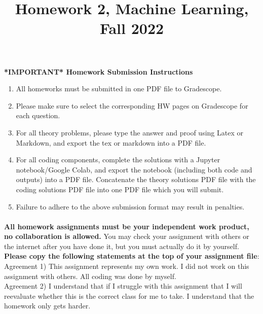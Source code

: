 \documentclass{exam}
\title{Homework 2, Machine Learning, Fall 2022}
\author{ }
\date{}
\begin{document}
\maketitle
\textbf{*IMPORTANT* Homework Submission Instructions}
\begin{enumerate}
    \item All homeworks must be submitted in one PDF file to Gradescope. 
    \item Please make sure to select the corresponding HW pages on Gradescope for each question.
    \item For all theory problems, please type the answer and proof using Latex or Markdown, and export the tex or markdown into a PDF file. 
    \item For all coding components, complete the solutions with a Jupyter notebook/Google Colab, and export the notebook (including both code and outputs) into a PDF file. Concatenate the theory solutions PDF file with the coding solutions PDF file into one PDF file which you will submit. 
    \item Failure to adhere to the above submission format may result in penalties.  
\end{enumerate}


\paragraph{} \textbf{All homework assignments must be your independent work product, no collaboration is allowed.} You may check your assignment with others or the internet after you have done it, but you must actually do it by yourself. \textbf{Please copy the following statements at the top of your assignment file}: \\

Agreement 1) This assignment represents my own work. I did not work on this assignment with others. All coding was done by myself. \\

Agreement 2) I understand that if I struggle with this assignment that I will reevaluate whether this is the correct class for me to take. I understand that the homework only gets harder.\\\\

\vspace{4in}

\end{document}
